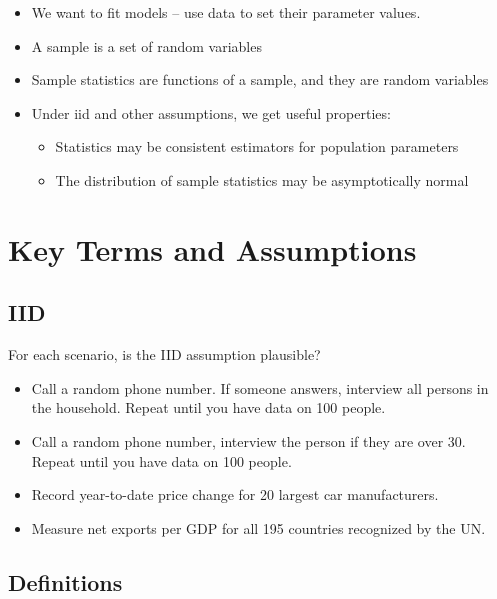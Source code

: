 \documentclass[
]{book}
\providecommand{\tightlist}{%
  \setlength{\itemsep}{0pt}\setlength{\parskip}{0pt}}
\theoremstyle{definition}
\theoremstyle{definition}
\theoremstyle{definition}
\theoremstyle{definition}
\theoremstyle{remark}
\begin{document}
\begin{itemize}
\tightlist
\item
  We want to fit models -- use data to set their parameter values.
\item
  A sample is a set of random variables
\item
  Sample statistics are functions of a sample, and they are random variables
\item
  Under iid and other assumptions, we get useful properties:

  \begin{itemize}
  \tightlist
  \item
    Statistics may be consistent estimators for population parameters
  \item
    The distribution of sample statistics may be asymptotically normal
  \end{itemize}
\end{itemize}

\hypertarget{key-terms-and-assumptions}{%
\section{Key Terms and Assumptions}\label{key-terms-and-assumptions}}

\hypertarget{iid}{%
\subsection{IID}\label{iid}}

For each scenario, is the IID assumption plausible?

\begin{itemize}
\tightlist
\item
  Call a random phone number. If someone answers, interview all persons in the household. Repeat until you have data on 100 people.
\item
  Call a random phone number, interview the person if they are over 30. Repeat until you have data on 100 people.
\item
  Record year-to-date price change for 20 largest car manufacturers.
\item
  Measure net exports per GDP for all 195 countries recognized by the UN.
\end{itemize}

\hypertarget{definitions}{%
\subsection{Definitions}\label{definitions}}
\end{document}
